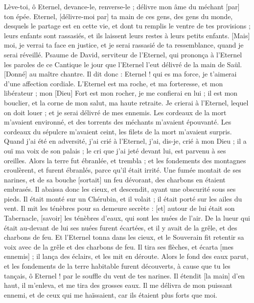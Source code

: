 \begin{multicols}{2}
Lève-toi, ô Eternel, devance-le, renverse-le ; délivre mon âme du méchant [par] ton épée.
Eternel, [délivre-moi par] ta main de ces gens, des gens du monde, desquels le partage est en cette vie, et dont tu remplis le ventre de tes provisions ; leurs enfants sont rassasiés, et ils laissent leurs restes à leurs petits enfants.
[Mais] moi, je verrai ta face en justice, et je serai rassasié de ta ressemblance, quand je serai réveillé.
\VerseOne{}Psaume de David, serviteur de l'Eternel, qui prononça à l'Eternel les paroles de ce Cantique le jour que l'Eternel l'eut délivré de la main de Saül. [Donné] au maître chantre. Il dit donc : Eternel ! qui es ma force, je t'aimerai d'une affection cordiale.
L'Eternel est ma roche, et ma forteresse, et mon libérateur ; mon [Dieu] Fort est mon rocher, je me confierai en lui ; il est mon bouclier, et la corne de mon salut, ma haute retraite.
Je crierai à l'Eternel, lequel on doit louer ; et je serai délivré de mes ennemis.
Les cordeaux de la mort m'avaient environné, et des torrents des méchants m'avaient épouvanté.
Les cordeaux du sépulcre m'avaient ceint, les filets de la mort m'avaient surpris.
Quand j'ai été en adversité, j'ai crié à l'Eternel, j'ai, dis-je, crié à mon Dieu ; il a ouï ma voix de son palais ; le cri que j'ai jeté devant lui, est parvenu à ses oreilles.
Alors la terre fut ébranlée, et trembla ; et les fondements des montagnes croulèrent, et furent ébranlés, parce qu'il était irrité.
Une fumée montait de ses narines, et de sa bouche [sortait] un feu dévorant, des charbons en étaient embrasés.
Il abaissa donc les cieux, et descendit, ayant une obscurité sous ses pieds.
Il était monté sur un Chérubin, et il volait ; il était porté sur les ailes du vent.
Il mit les ténèbres pour sa demeure secrète : [et] autour de lui était son Tabernacle, [savoir] les ténèbres d'eaux, qui sont les nuées de l'air.
De la lueur qui était au-devant de lui ses nuées furent écartées, et il y avait de la grêle, et des charbons de feu.
Et l'Eternel tonna dans les cieux, et le Souverain fit retentir sa voix avec de la grêle et des charbons de feu.
Il tira ses flèches, et écarta [mes ennemis] ; il lança des éclairs, et les mit en déroute.
Alors le fond des eaux parut, et les fondements de la terre habitable furent découverts, à cause que tu les tançais, ô Eternel ! par le souffle du vent de tes narines.
Il étendit [la main] d'en haut, il m'enleva, et me tira des grosses eaux.
Il me délivra de mon puissant ennemi, et de ceux qui me haïssaient, car ils étaient plus forts que moi.

\end{multicols}
